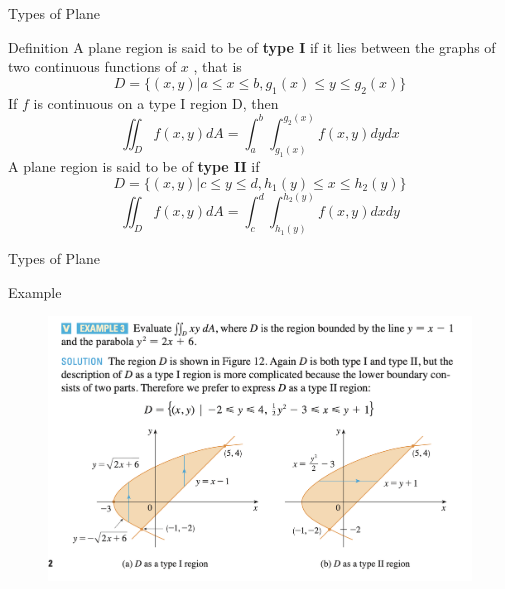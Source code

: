 \documentclass[aspectratio=169, UTF8]{beamer}
\begin{document}
\begin{frame}{Types of Plane}
    \begin{block}{Definition}
        A plane region is said to be of \textbf{type I} if it lies between the graphs of two continuous functions of $x$ , that is
        \begin{equation*}
            D=\{(x,y)|a\leq x\leq b, g_1(x)\leq y\leq g_2(x)\}
        \end{equation*}
        If $f$ is continuous on a type I region D, then
        \begin{equation*}
            \iint_Df(x,y)dA=\int_a^b\int_{g_1(x)}^{g_2(x)}f(x,y)dydx
        \end{equation*}
        A plane region is said to be of \textbf{type II} if
        \begin{equation*}
            D=\{(x,y)|c\leq y\leq d, h_1(y)\leq x\leq h_2(y)\}
        \end{equation*}
        \begin{equation*}
            \iint_Df(x,y)dA=\int_c^d\int_{h_1(y)}^{h_2(y)}f(x,y)dxdy
        \end{equation*}
    \end{block}
\end{frame}
\begin{frame}{Types of Plane}
    \begin{block}{Example}
        \begin{figure}
            \centering
            \includegraphics[width=0.75\linewidth]{TypeI&II_example.png}
            \label{fig:enter-label}
        \end{figure}
    \end{block}
\end{frame}
\end{document}
